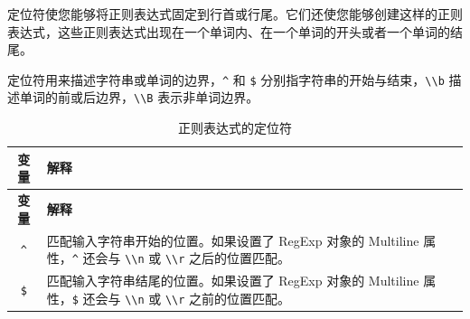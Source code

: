 \documentclass[doctor,openright,twoside]{sjtuthesis}
\newcommand{\passthrough}[1]{#1}
\theoremstyle{plain}
\theoremstyle{definition}
\theoremstyle{remark}
\theoremstyle{ocrenumbox}
\theoremstyle{plain}
\begin{document}
定位符使您能够将正则表达式固定到行首或行尾。它们还使您能够创建这样的正则表达式，这些正则表达式出现在一个单词内、在一个单词的开头或者一个单词的结尾。

定位符用来描述字符串或单词的边界，\passthrough{\lstinline!^!} 和 \passthrough{\lstinline!$!} 分别指字符串的开始与结束，\passthrough{\lstinline!\\b!} 描述单词的前或后边界，\passthrough{\lstinline!\\B!} 表示非单词边界。

\begin{longtable}[]{@{}cl@{}}
\caption{正则表达式的定位符}\tabularnewline
\toprule
\begin{minipage}[b]{0.23\columnwidth}\centering
\textbf{变量}\strut
\end{minipage} & \begin{minipage}[b]{0.72\columnwidth}\raggedright
\textbf{解释}\strut
\end{minipage}\tabularnewline
\midrule
\endfirsthead
\toprule
\begin{minipage}[b]{0.23\columnwidth}\centering
\textbf{变量}\strut
\end{minipage} & \begin{minipage}[b]{0.72\columnwidth}\raggedright
\textbf{解释}\strut
\end{minipage}\tabularnewline
\midrule
\endhead
\begin{minipage}[t]{0.23\columnwidth}\centering
\passthrough{\lstinline!^!}\strut
\end{minipage} & \begin{minipage}[t]{0.72\columnwidth}\raggedright
匹配输入字符串开始的位置。如果设置了 RegExp 对象的 Multiline 属性，\passthrough{\lstinline!^!} 还会与 \passthrough{\lstinline!\\n!} 或 \passthrough{\lstinline!\\r!} 之后的位置匹配。\strut
\end{minipage}\tabularnewline
\begin{minipage}[t]{0.23\columnwidth}\centering
\passthrough{\lstinline!$!}\strut
\end{minipage} & \begin{minipage}[t]{0.72\columnwidth}\raggedright
匹配输入字符串结尾的位置。如果设置了 RegExp 对象的 Multiline 属性，\passthrough{\lstinline!$!} 还会与 \passthrough{\lstinline!\\n!} 或 \passthrough{\lstinline!\\r!} 之前的位置匹配。\strut
\end{minipage}\tabularnewline

\end{longtable}
\end{document}
